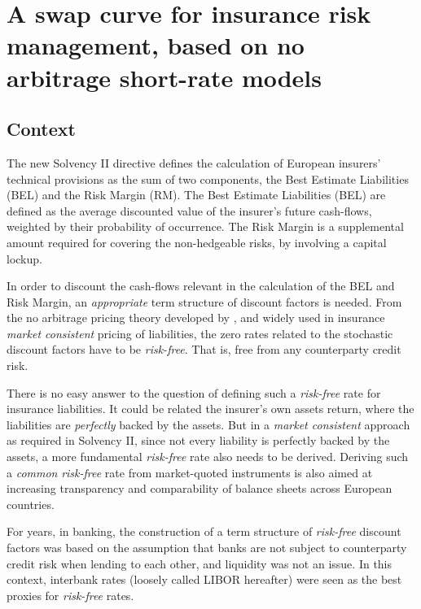 %
\chapter{A swap curve for insurance risk management, based on no arbitrage short-rate  models}
\label{sec:insurance_swap_curve}


\section{Context}
\label{intro}

The new Solvency II directive defines the calculation of European insurers' technical provisions as the sum of two components, the Best Estimate Liabilities (BEL) and the Risk Margin (RM). The Best Estimate Liabilities (BEL) are defined as the average discounted value of the insurer’s future cash-flows, weighted by their probability of occurrence. The Risk Margin is a supplemental amount required for covering the non-hedgeable risks, by involving a  capital lockup.\medskip

In order to discount the cash-flows relevant in the calculation of the BEL and Risk Margin, an  \textit{appropriate} term structure of discount factors is needed. From the no arbitrage pricing theory developed by \cite{harrison1981martingales}, and  widely used in insurance \textit{market consistent} pricing of liabilities, the zero rates related to the stochastic discount factors have to be {\it risk-free}. That is, free from any counterparty credit risk.

\medskip

There is no easy answer to the question of defining such a {\it risk-free} rate for insurance liabilities. It could be related the insurer’s own assets return, where the liabilities are \textit{perfectly} backed by the assets.  But in a {\it market consistent} approach as required in Solvency II, since not every liability is perfectly backed by the assets, a more fundamental {\it risk-free} rate also needs to be derived. Deriving such a \textit{common} {\it risk-free} rate from market-quoted instruments is also aimed at  increasing transparency and comparability of balance sheets across European countries. \medskip

For years, in banking, the construction of a term structure of {\it risk-free} discount factors was based on the assumption that banks are not subject to counterparty credit risk when lending to each other, and liquidity was not an issue. In this context, interbank rates (loosely called LIBOR hereafter) were seen as the best proxies for {\it risk-free} rates.

